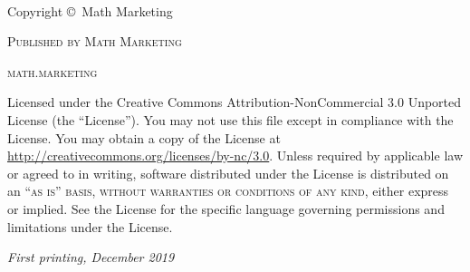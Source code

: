 \newpage
~\vfill
\thispagestyle{empty}
\NoBgThispage

\noindent \textcolor{DarkPurple}{Copyright \copyright\ Math Marketing\\} %

\noindent \textcolor{DarkPurple}{\textsc{Published by Math Marketing}\\} %

\noindent \textcolor{DarkPurple}{\textsc{math.marketing}\\} %

\noindent \textcolor{DarkPurple}{Licensed under the Creative Commons Attribution-NonCommercial 3.0 Unported License (the ``License''). You may not use this file except in compliance with the License. You may obtain a copy of the License at \url{http://creativecommons.org/licenses/by-nc/3.0}. Unless required by applicable law or agreed to in writing, software distributed under the License is distributed on an \textsc{``as is'' basis, without warranties or conditions of any kind}, either express or implied. See the License for the specific language governing permissions and limitations under the License.\\} %

\noindent \textcolor{DarkPurple}{\textit{First printing, December 2019}} %

\newpage